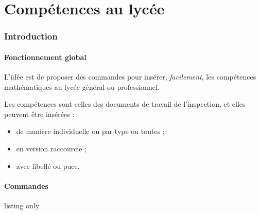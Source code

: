 \part{Compétences au lycée}\label{competlycee}

\section{Introduction}

\subsection{Fonctionnement global}

\begin{tipblock}
L'idée est de proposer des commandes pour insérer, \textit{facilement}, les compétences mathématiques au lycée général ou professionnel.

\smallskip

Les compétences sont celles des documents de travail de l'inspection, et elles peuvent être insérées :

\begin{itemize}
	\item de manière individuelle ou par type ou toutes ;
	\item en version raccourcie ;
	\item avec libellé ou puce.
\end{itemize}
\vspace*{-\baselineskip}\leavevmode
\end{tipblock}

\subsection{Commandes}

\begin{PresCodeTexPL}{listing only}

\end{PresCodeTexPL}

